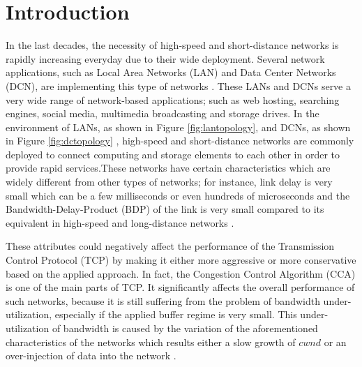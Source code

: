 \documentclass[preprint,3p,times,twocolumn,authoryear]{elsarticle}
\begin{document}






\section{Introduction}
\label{Intro}
In the last decades, the necessity of high-speed and short-distance networks is rapidly increasing everyday due to their wide deployment. Several network applications, such as Local Area Networks (LAN) and Data Center Networks (DCN), are implementing this type of networks \citep{Buyya2008, Armbrust2010}. These LANs and DCNs serve a very wide range of network-based applications; such as web hosting, searching engines, social media, multimedia broadcasting and storage drives. In the environment of LANs, as shown in Figure \ref{fig:lantopology}, and DCNs, as shown in Figure \ref{fig:dctopology} \citep{Alfares2010, Wu2012, Yoo2012, prakash2012}, high-speed and short-distance networks are commonly deployed to connect computing and storage elements to each other in order to provide rapid services.These networks have certain characteristics which are widely different from other types of networks; for instance, link delay is very small which can be a few milliseconds or even hundreds of microseconds and the Bandwidth-Delay-Product (BDP) of the link is very small compared to its equivalent in high-speed and long-distance networks \citep{Tahiliani2012, Vasudevan2009}.

These attributes could negatively affect the performance of the Transmission Control Protocol (TCP) by making it either more aggressive or more conservative based on the applied approach. In fact, the Congestion Control Algorithm (CCA) is one of the main parts of TCP. It significantly affects the overall performance of such networks, because it is still suffering from the problem of bandwidth under-utilization, especially if the applied buffer regime is very small. This under-utilization of bandwidth is caused by the variation of the aforementioned characteristics of the networks which results either a slow growth of $cwnd$ or an over-injection of data into the network \citep{Afanasyev2010, Scharf2011, Callegari2012b, Callegari2014, Lar2013, acharya2012, alrshah2014}.
\end{document}

